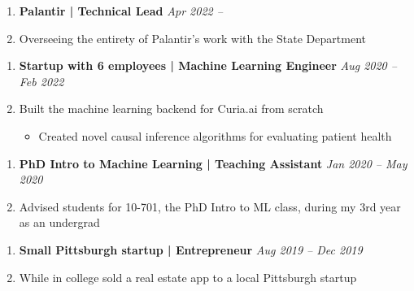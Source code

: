 \documentclass[letterpaper,11pt]{article}
\newcommand{\resitem}[1]{\item #1 \vspace{-2pt}}
\begin{document}
\begin{enumerate}[leftmargin=10pt]
	\item[] \textbf{\Large Palantir | \textcolor{myBlue}{Technical Lead}}  \cftdotfill{\cftdotsep} \large \textit{\textcolor{myBlue}{Apr 2022 --}}\\
	\item[] \large Overseeing the entirety of Palantir's work with the State Department%
\end{enumerate}

\begin{enumerate}[leftmargin=10pt]
	\item[] \textbf{\Large Startup with 6 employees | \textcolor{myBlue}{Machine Learning Engineer}}  \cftdotfill{\cftdotsep} \large \textit{\textcolor{myBlue}{Aug 2020 --} Feb 2022}\\
	\item[] \large Built the machine learning backend for Curia.ai from scratch
	\begin{itemize}
		\resitem{Created novel causal inference algorithms for evaluating patient health}
	\end{itemize}
\end{enumerate}

\begin{enumerate}[leftmargin=10pt]
	\item[] \textbf{\Large PhD Intro to Machine Learning | \textcolor{myBlue}{Teaching Assistant}}  \cftdotfill{\cftdotsep} \large \textit{\textcolor{myBlue}{Jan 2020 --} May 2020}\\
	\item[] \large Advised students for 10-701, the PhD Intro to ML class, during my 3rd year as an undergrad
\end{enumerate}

\begin{enumerate}[leftmargin=10pt]
	\item[] \textbf{\Large Small Pittsburgh startup | \textcolor{myBlue}{Entrepreneur}}  \cftdotfill{\cftdotsep} \large \textit{\textcolor{myBlue}{Aug 2019 --} Dec 2019}\\
	\item[] \large While in college sold a real estate app to a local Pittsburgh startup
\end{enumerate}
\end{document}
